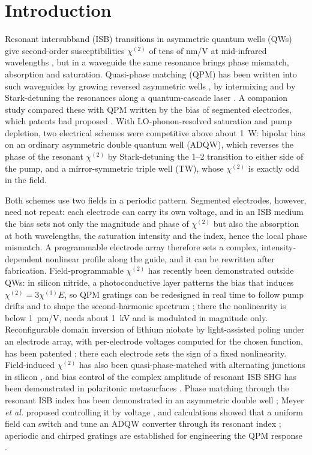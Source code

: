 \documentclass[11pt]{article}
\newcommand{\chitwo}{\chi^{(2)}}
\begin{document}
\section{Introduction}
Resonant intersubband (ISB) transitions in asymmetric quantum wells (QWs) give second-order susceptibilities $\chitwo$ of tens of nm/V at mid-infrared wavelengths \cite{Rosencher1996,Vurgaftman2021}, but in a waveguide the same resonance brings phase mismatch, absorption and saturation. Quasi-phase matching (QPM) has been written into such waveguides by growing reversed asymmetric wells \cite{Janz1994,Fiore1997}, by intermixing \cite{Bouchard2000,Zeaiter2003} and by Stark-detuning the resonances along a quantum-cascade laser \cite{Belkin2006}. A companion study \cite{OwnbyN1} compared these with QPM written by the bias of segmented electrodes, which patents had proposed \cite{Patent4880297,Patent5289309}. With LO-phonon-resolved saturation and pump depletion, two electrical schemes were competitive above about 1~W: bipolar bias on an ordinary asymmetric double quantum well (ADQW), which reverses the phase of the resonant $\chitwo$ by Stark-detuning the 1--2 transition to either side of the pump, and a mirror-symmetric triple well (TW), whose $\chitwo$ is exactly odd in the field.

Both schemes use two fields in a periodic pattern. Segmented electrodes, however, need not repeat: each electrode can carry its own voltage, and in an ISB medium the bias sets not only the magnitude and phase of $\chitwo$ but also the absorption at both wavelengths, the saturation intensity and the index, hence the local phase mismatch. A programmable electrode array therefore sets a complex, intensity-dependent nonlinear profile along the guide, and it can be rewritten after fabrication. Field-programmable $\chitwo$ has recently been demonstrated outside QWs: in silicon nitride, a photoconductive layer patterns the bias that induces $\chitwo=3\chi^{(3)}E$, so QPM gratings can be redesigned in real time to follow pump drifts and to shape the second-harmonic spectrum \cite{Yanagimoto2026}; there the nonlinearity is below 1~pm/V, needs about 1~kV and is modulated in magnitude only. Reconfigurable domain inversion of lithium niobate by light-assisted poling under an electrode array, with per-electrode voltages computed for the chosen function, has been patented \cite{PatentVanCamp}; there each electrode sets the sign of a fixed nonlinearity. Field-induced $\chitwo$ has also been quasi-phase-matched with alternating junctions in silicon \cite{Timurdogan2017}, and bias control of the complex amplitude of resonant ISB SHG has been demonstrated in polaritonic metasurfaces \cite{Yu2025}. Phase matching through the resonant ISB index has been demonstrated in an asymmetric double well \cite{Vodopyanov1998}; Meyer \emph{et al.} proposed controlling it by voltage \cite{Meyer1995APL}, and calculations showed that a uniform field can switch and tune an ADQW converter through its resonant index \cite{Vurgaftman1996SSC}; aperiodic and chirped gratings are established for engineering the QPM response \cite{Fejer1992,Arbore1997}.
\end{document}
